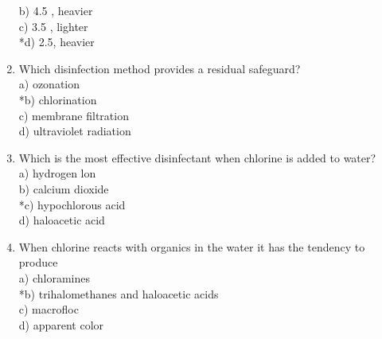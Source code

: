 \begin{enumerate}[1.]
b) 4.5 , heavier\\
c) 3.5 , lighter\\
*d) 2.5, heavier\\
  \item Which disinfection method provides a residual safeguard?\\
a) ozonation\\
*b) chlorination\\
c) membrane filtration\\
d) ultraviolet radiation\\
  \item Which is the most effective disinfectant when chlorine is added to water?\\
a) hydrogen lon\\
b) calcium dioxide\\
*c) hypochlorous acid\\
d) haloacetic acid\\
  \item When chlorine reacts with organics in the water it has the tendency to produce\\
a) chloramines\\
*b) trihalomethanes and haloacetic acids\\
c) macrofloc\\
d) apparent color\\


\end{enumerate}
